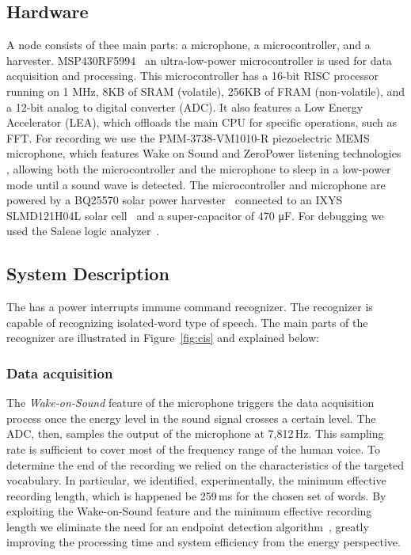 \subsection{Hardware}
A \cim node consists of thee main parts: a microphone, a microcontroller, and a harvester. MSP430RF5994~\cite{ti_msp430_website} an ultra-low-power microcontroller is used for data acquisition and processing. This microcontroller has a 16-bit RISC processor running on 1 MHz, 8KB of SRAM (volatile), 256KB of FRAM (non-volatile), and a 12-bit analog to digital converter (ADC). It also features a Low Energy Accelerator (LEA), which offloads the main CPU for specific operations, such as FFT. For recording we use the PMM-3738-VM1010-R piezoelectric MEMS microphone, which features Wake on Sound and ZeroPower listening technologies \cite{microphone}, allowing both the microcontroller and the microphone to sleep in a low-power mode until a sound wave is detected.
The microcontroller and microphone are powered by a BQ25570 solar power harvester~\cite{BQ25570EVM-206_website} connected to an IXYS SLMD121H04L solar cell~\cite{SLMD121H04L_website} and a super-capacitor of 470 \si{\micro F}. For debugging we used the Saleae logic analyzer~\cite{saleae}.

\subsection{System Description}
The \cim has a power interrupts immune command recognizer. The recognizer is capable of recognizing isolated-word type of speech. 
The main parts of the recognizer are illustrated in Figure~\ref{fig:cis} and explained below:

\subsubsection{Data acquisition}
The \textit{Wake-on-Sound} feature of the microphone triggers the data acquisition process once the energy level in the sound signal crosses a certain level. The ADC, then, samples the output of the microphone at 7,812\,Hz. This sampling rate is sufficient to cover most of the frequency range of the human voice. To determine the end of the recording we relied on the characteristics of the targeted vocabulary. In particular, we identified, experimentally, the minimum effective recording length, which is happened be 259\,ms for the chosen set of words. By exploiting the Wake-on-Sound feature and the minimum effective recording length we eliminate the need for an endpoint detection algorithm~\cite{}, greatly improving the processing time and system efficiency from the energy perspective.


